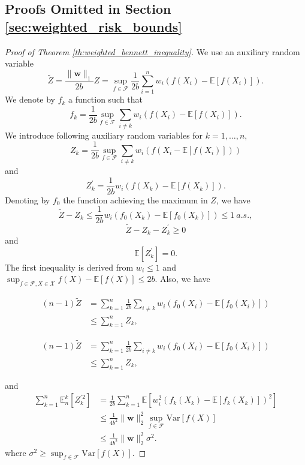 \documentclass[letterpaper]{article} %
\def\DoubleColumn{}
\def\DoubleColumnEnd{}
\def\SingleColumn{}
\def\SingleColumnEnd{}
\newcommand{\E}{\mathbb{E}}
\newcommand{\Var}{\text{Var}}
\newcommand{\weight}{\mathbf{w}}
\newcommand{\normo}[1]{\|#1\|_1}
\begin{document}
\subsection{Proofs Omitted in Section \ref{sec:weighted_risk_bounds}} %
\label{sec:proof_omitted_in_section_sec:weighted_risk_bounds}


\begin{proof}[Proof of Theorem \ref{th:weighted_bennett_inequality}] %
    We use an auxiliary random variable
    \[\widetilde{Z}=\frac{\normo{\weight{}}}{2b}Z=\sup_{f\in\mathcal{F}}\frac{1}{2b}\sum_{i=1}^nw_i\allowbreak(f(X_i)-\E[f(X_i)]).\]
    We denote by $f_k$ a function such that
    \[f_k = \frac{1}{2b}\sup_{f\in\mathcal F} \sum_{i\neq k}w_i(f(X_i)-\E[f(X_i)]).\]
    We introduce following auxiliary random variables for $k=1,\dots,n$,
    \[Z_k = \frac{1}{2b}\sup_{f\in\mathcal F} \sum_{i\neq k}w_i(f(X_i-\E[f(X_i)]))\]
    and
    \[Z_k^\prime = \frac{1}{2b}w_i(f(X_k)-\E[f(X_k)]).\]
    Denoting by $f_0$ the function achieving the maximum in $Z$, we have
    \[\widetilde{Z}-Z_k\le \frac{1}{2b}w_i(f_0(X_k)-\E[f_0(X_k)])\le 1\ a.s.,\]
    \[\widetilde{Z}-Z_k-Z_k^\prime\ge 0\]
    and
    \[\E[Z_k^\prime] = 0.\]
    The first inequality is derived from $w_i\le 1$ and $\sup_{f\in\mathcal{F}, X\in\mathcal{X}} f(X)-\E[f(X)]\le 2b$.
    Also, we have
    \DoubleColumn
    \begin{align*}
        (n-1)\widetilde{Z} &= \sum_{k=1}^n\frac{1}{2b}\sum_{i\neq k}w_i(f_0(X_i)-\E[f_0(X_i)])\\
        &\le \sum_{k=1}^n Z_k,
    \end{align*}
    \DoubleColumnEnd
    \SingleColumn
    \begin{align*}
        (n-1)\widetilde{Z} &= \sum_{k=1}^n\frac{1}{2b}\sum_{i\neq k}w_i(f_0(X_i)-\E[f_0(X_i)])\\
        &\le \sum_{k=1}^n Z_k,
    \end{align*}
    \SingleColumnEnd
    and
    \begin{align*}
        \sum_{k=1}^n \E_n^k[Z_k^{\prime2}] &= \frac{1}{2b}\sum_{k=1}^n \E[w_i^2(f_k(X_k)-\E[f_k(X_k)])^2]\\
        &\le \frac{1}{4b^2}\|\weight{}\|_2^2\sup_{f\in\mathcal F}\Var[f(X)]\\
        &\le \frac{1}{4b^2}\|\weight{}\|_2^2\sigma^2.
    \end{align*}
    where $\sigma^2\ge \sup_{f\in\mathcal F}\Var[f(X)]$.

\end{proof}
\end{document}
